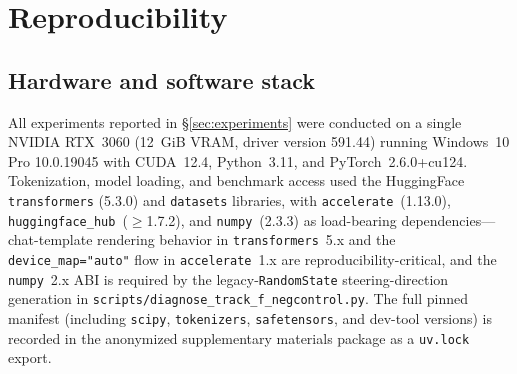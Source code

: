 \documentclass{article}
\begin{document}
\appendix
\section{Reproducibility}\label{sec:reproducibility}

\subsection{Hardware and software stack}
All experiments reported in §\ref{sec:experiments} were conducted on a single NVIDIA RTX~3060 (12~GiB VRAM, driver version 591.44) running Windows~10 Pro 10.0.19045 with CUDA~12.4, Python~3.11, and PyTorch~2.6.0+cu124. Tokenization, model loading, and benchmark access used the HuggingFace \texttt{transformers} (5.3.0) and \texttt{datasets} libraries, with \texttt{accelerate}~(1.13.0), \texttt{huggingface\_hub}~($\geq$1.7.2), and \texttt{numpy}~(2.3.3) as load-bearing dependencies---chat-template rendering behavior in \texttt{transformers}~5.x and the \texttt{device\_map="auto"} flow in \texttt{accelerate}~1.x are reproducibility-critical, and the \texttt{numpy}~2.x ABI is required by the legacy-\texttt{RandomState} steering-direction generation in \texttt{scripts/diagnose\_track\_f\_negcontrol.py}. The full pinned manifest (including \texttt{scipy}, \texttt{tokenizers}, \texttt{safetensors}, and dev-tool versions) is recorded in the anonymized supplementary materials package as a \texttt{uv.lock} export.
\end{document}
